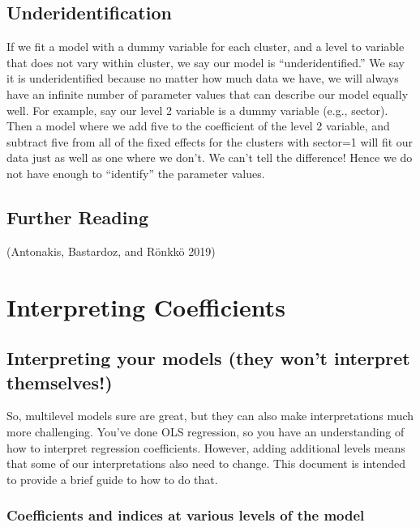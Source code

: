 \documentclass[
  letterpaper,
  DIV=11,
  numbers=noendperiod]{scrreprt}
\begin{document}
\hypertarget{underidentification}{%
\section{Underidentification}\label{underidentification}}

If we fit a model with a dummy variable for each cluster, and a level to
variable that does not vary within cluster, we say our model is
``underidentified.'' We say it is underidentified because no matter how
much data we have, we will always have an infinite number of parameter
values that can describe our model equally well. For example, say our
level 2 variable is a dummy variable (e.g., sector). Then a model where
we add five to the coefficient of the level 2 variable, and subtract
five from all of the fixed effects for the clusters with sector=1 will
fit our data just as well as one where we don't. We can't tell the
difference! Hence we do not have enough to ``identify'' the parameter
values.

\hypertarget{further-reading-1}{%
\section{Further Reading}\label{further-reading-1}}

(Antonakis, Bastardoz, and Rönkkö 2019)

\hypertarget{interpreting-coefficients}{%
\chapter{Interpreting Coefficients}\label{interpreting-coefficients}}

\hypertarget{interpreting-your-models-they-wont-interpret-themselves}{%
\section{Interpreting your models (they won't interpret
themselves!)}\label{interpreting-your-models-they-wont-interpret-themselves}}

So, multilevel models sure are great, but they can also make
interpretations much more challenging. You've done OLS regression, so
you have an understanding of how to interpret regression coefficients.
However, adding additional levels means that some of our interpretations
also need to change. This document is intended to provide a brief guide
to how to do that.

\hypertarget{coefficients-and-indices-at-various-levels-of-the-model}{%
\subsection*{Coefficients and indices at various levels of the
model}\label{coefficients-and-indices-at-various-levels-of-the-model}}
\end{document}
